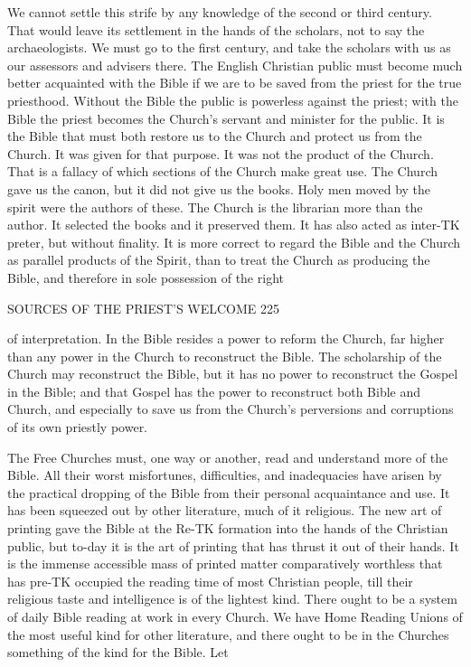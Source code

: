 \documentclass[12pt,a5paper,oneside]{book}
\begin{document}
{{We cannot settle this strife by any knowledge of 
the second or third century. That would leave its 
settlement in the hands of the scholars, not to say 
the archaeologists. We must go to the first century, 
and take the scholars with us as our assessors and 
advisers there. The English Christian public must 
become much better acquainted with the Bible if we 
are to be saved from the priest for the true priesthood. 
Without the Bible the public is powerless against the 
priest; with the Bible the priest becomes the Church's 
servant and minister for the public. It is the Bible 
that must both restore us to the Church and protect 
us from the Church. It was given for that purpose. 
It was not the product of the Church. That is a 
fallacy of which sections of the Church make great 
use. The Church gave us the canon, but it did not 
give us the books. Holy men moved by the spirit 
were the authors of these. The Church is the 
librarian more than the author. It selected the books 
and it preserved them. It has also acted as inter-TK
preter, but without finality. It is more correct to 
regard the Bible and the Church as parallel products 
of the Spirit, than to treat the Church as producing 
the Bible, and therefore in sole possession of the right 



SOURCES OF THE PRIEST'S WELCOME 225 

of interpretation. In the Bible resides a power to 
reform the Church, far higher than any power in the 
Church to reconstruct the Bible. The scholarship of 
the Church may reconstruct the Bible, but it has no 
power to reconstruct the Gospel in the Bible; and 
that Gospel has the power to reconstruct both Bible 
and Church, and especially to save us from the 
Church's perversions and corruptions of its own 
priestly power. 

The Free Churches must, one way or another, 
read and understand more of the Bible. All their 
worst misfortunes, difficulties, and inadequacies have 
arisen by the practical dropping of the Bible from 
their personal acquaintance and use. It has been 
squeezed out by other literature, much of it religious. 
The new art of printing gave the Bible at the Re-TK
formation into the hands of the Christian public, but 
to-day it is the art of printing that has thrust it out of 
their hands. It is the immense accessible mass of 
printed matter comparatively worthless that has pre-TK
occupied the reading time of most Christian people, 
till their religious taste and intelligence is of the 
lightest kind. There ought to be a system of daily 
Bible reading at work in every Church. We have 
Home Reading Unions of the most useful kind for 
other literature, and there ought to be in the 
Churches something of the kind for the Bible. Let 

}}
\end{document}
